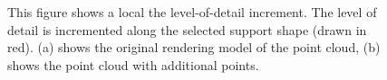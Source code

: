 \begin{figure}
\centering
{}
\caption[Example of the local increment of level of detail]
{This figure shows a local the level-of-detail increment. The level of detail is incremented along the selected support shape (drawn in red). (a) shows the original rendering model of the point cloud, (b) shows the point cloud with additional points. }
\label{fig:technologiezentrum_lod_increment}
\end{figure}



